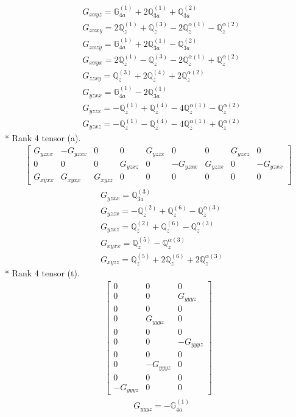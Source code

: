 \documentclass[fleqn,8pt,landscape]{jsarticle}
\begin{document}
\begin{align*}
& G_{xxyz} = \mathbb{G}_{4a}^{(1)} + 2 \mathbb{Q}_{3a}^{(1)} + \mathbb{Q}_{3a}^{(2)} \\
& G_{xxxy} = 2 \mathbb{Q}_{z}^{(1)} + \mathbb{Q}_{z}^{(3)} - 2 \mathbb{Q}_{z}^{\alpha(1)} - \mathbb{Q}_{z}^{\alpha(2)} \\
& G_{xxzy} = \mathbb{G}_{4a}^{(1)} + 2 \mathbb{Q}_{3a}^{(1)} - \mathbb{Q}_{3a}^{(2)} \\
& G_{xxyx} = 2 \mathbb{Q}_{z}^{(1)} - \mathbb{Q}_{z}^{(3)} - 2 \mathbb{Q}_{z}^{\alpha(1)} + \mathbb{Q}_{z}^{\alpha(2)} \\
& G_{zzxy} = \mathbb{Q}_{z}^{(3)} + 2 \mathbb{Q}_{z}^{(4)} + 2 \mathbb{Q}_{z}^{\alpha(2)} \\
& G_{yzxx} = \mathbb{G}_{4a}^{(1)} - 2 \mathbb{Q}_{3a}^{(1)} \\
& G_{yzzx} = - \mathbb{Q}_{z}^{(1)} + \mathbb{Q}_{z}^{(4)} - 4 \mathbb{Q}_{z}^{\alpha(1)} - \mathbb{Q}_{z}^{\alpha(2)} \\
& G_{yzxz} = - \mathbb{Q}_{z}^{(1)} - \mathbb{Q}_{z}^{(4)} - 4 \mathbb{Q}_{z}^{\alpha(1)} + \mathbb{Q}_{z}^{\alpha(2)}
\end{align*}
* Rank 4 tensor (a).
\begin{align*}
\begin{bmatrix} G_{yzxx} & - G_{yzxx} & 0 & 0 & G_{yzzx} & 0 & 0 & G_{yzxz} & 0 \\ 0 & 0 & 0 & G_{yzxz} & 0 & - G_{yzxx} & G_{yzzx} & 0 & - G_{yzxx} \\ G_{xyxx} & G_{xyxx} & G_{xyzz} & 0 & 0 & 0 & 0 & 0 & 0 \end{bmatrix}
\end{align*}
\begin{align*}
& G_{yzxx} = \mathbb{Q}_{3a}^{(3)} \\
& G_{yzzx} = - \mathbb{Q}_{z}^{(2)} + \mathbb{Q}_{z}^{(6)} - \mathbb{Q}_{z}^{\alpha(3)} \\
& G_{yzxz} = \mathbb{Q}_{z}^{(2)} + \mathbb{Q}_{z}^{(6)} - \mathbb{Q}_{z}^{\alpha(3)} \\
& G_{xyxx} = \mathbb{Q}_{z}^{(5)} - \mathbb{Q}_{z}^{\alpha(3)} \\
& G_{xyzz} = \mathbb{Q}_{z}^{(5)} + 2 \mathbb{Q}_{z}^{(6)} + 2 \mathbb{Q}_{z}^{\alpha(3)}
\end{align*}
* Rank 4 tensor (t).
\begin{align*}
\begin{bmatrix} 0 & 0 & 0 \\ 0 & 0 & G_{yyyz} \\ 0 & 0 & 0 \\ 0 & G_{yyyz} & 0 \\ 0 & 0 & 0 \\ 0 & 0 & - G_{yyyz} \\ 0 & 0 & 0 \\ 0 & - G_{yyyz} & 0 \\ 0 & 0 & 0 \\ - G_{yyyz} & 0 & 0 \end{bmatrix}
\end{align*}
\begin{align*}
& G_{yyyz} = - \mathbb{G}_{4a}^{(1)}
\end{align*}
\end{document}
